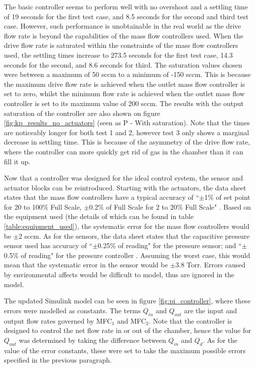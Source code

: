 The basic controller seems to perform well with no overshoot and a settling time of 19 seconds for the first test case, and 8.5 seconds for the second and third test case. However, such performance is unobtainable in the real world as the drive flow rate is beyond the capabilities of the mass flow controllers used. When the drive flow rate is saturated within the constraints of the mass flow controllers used, the settling times increase to 273.5 seconds for the first test case, 14.3 seconds for the second, and 8.6 seconds for third. The saturation values chosen were between a maximum of 50 sccm to a minimum of -150 sccm. This is because the maximum drive flow rate is achieved when the outlet mass flow controller is set to zero, whilst the minimum flow rate is achieved when the outlet mass flow controller is set to its maximum value of 200 sccm. The results with the output saturation of the controller are also shown on figure \ref{fig:kp_results_no_actuators} (seen as P - With saturation). Note that the times are noticeably longer for both test 1 and 2, however test 3 only shows a marginal decrease in settling time. This is because of the asymmetry of the drive flow rate, where the controller can more quickly get rid of gas in the chamber than it can fill it up. 

Now that a controller was designed for the ideal control system, the sensor and actuator blocks can be reintroduced. Starting with the actuators, the data sheet states that the mass flow controllers have a typical accuracy of ``$\pm$1\% of set point for 20 to 100\% Full Scale, $\pm$0.2\% of Full Scale for 2 to 20\% Full Scale" \cite{mks_ge50}. Based on the equipment used (the details of which can be found in table \ref{table:equipment_used}), the systematic error for the mass flow controllers would be $\pm$2 sccm. As for the sensors, the data sheet states that the capacitive pressure sensor used has accuracy of ``$\pm$0.25\% of reading" \cite{mks_623h} for the pressure sensor; and ``$\pm$0.5\% of reading" for the pressure controller \cite{mks_640b}. Assuming the worst case, this would mean that the systematic error in the sensor would be $\pm$3.8 Torr. Errors caused by environmental affects would be difficult to model, thus are ignored in the model.

The updated Simulink model can be seen in figure \ref{fig:pi_controller}, where these errors were modelled as constants. The terms $Q_{in}$ and $Q_{out}$ are the input and output flow rates governed by MFC$_1$ and MFC$_2$. Note that the controller is designed to control the net flow rate in or out of the chamber, hence the value for $Q_{out}$ was determined by taking the difference between $Q_{in}$ and $Q_{d}$. As for the value of the error constants, these were set to take the maximum possible errors specified in the previous paragraph.

